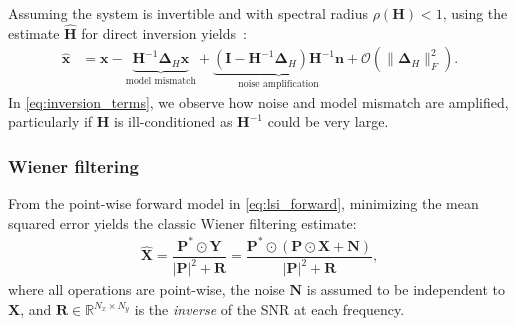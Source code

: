 \noindent Assuming the system is invertible and with spectral radius $\rho(\bm{H}) < 1$, using the estimate $\bm{\hat{H}}$ for direct inversion yields~\cite{9546648,9157433}:
\begin{align}
   \label{eq:inversion_terms}
   \bm{\hat{x}} &= \bm{x} - \underbrace{\bm{H}^{-1}\bm{\Delta}_H \bm{x}}_{\text{model mismatch}} + \underbrace{(\bm{I} - \bm{H}^{-1}\bm{\Delta}_H)\bm{H}^{-1}\bm{n}}_{\text{noise amplification}} + \mathcal{O}(\| \bm{\Delta}_H\|_F^2).
\end{align}
In \cref{eq:inversion_terms}, we observe how noise and model mismatch are amplified, particularly if $\bm{H}$ is ill-conditioned as $\bm{H}^{-1}$ could be very large.

\subsubsection{Wiener filtering} From the point-wise forward model in \cref{eq:lsi_forward}, minimizing the mean squared error yields the classic Wiener filtering estimate:
\begin{align}
    \label{eq:wiener}
    \bm{\hat{X}} = \dfrac{\bm{P}^*  \odot \bm{Y}}{ |\bm{P}|^2 + \bm{R}} =  \dfrac{\bm{P}^* \odot (\bm{P} \odot\bm{X} + \bm{N})}{ |\bm{P}|^2 + \bm{R}},
\end{align}
where all operations are point-wise,
the noise $\bm{N}$ is assumed to be independent to $\bm{X}$, and $\bm{R}\in \mathbb{R}^{N_x \times N_y}$ is the \textit{inverse} of the SNR at each frequency.

